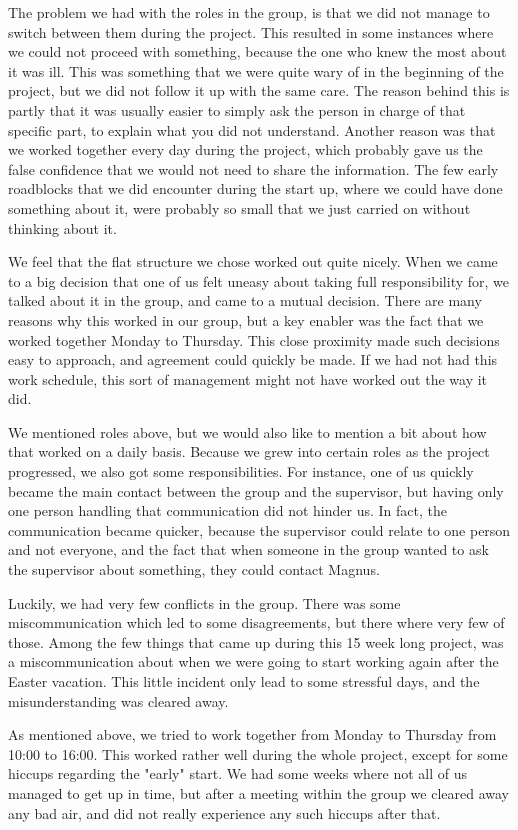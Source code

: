 The problem we had with the roles in the group, is that we did not manage to switch between them during the project. This resulted in some instances where we could not proceed with something, because the one who knew the most about it was ill. This was something that we were quite wary of in the beginning of the project, but we did not follow it up with the same care. The reason behind this is partly that it was usually easier to simply ask the person in charge of that specific part, to explain what you did not understand. Another reason was that we worked together every day during the project, which probably gave us the false confidence that we would not need to share the information. The few early roadblocks that we did encounter during the start up, where we could have done something about it, were probably so small that we just carried on without thinking about it.

We feel that the flat structure we chose worked out quite nicely. When we came to a big decision that one of us felt uneasy about taking full responsibility for, we talked about it in the group, and came to a mutual decision. There are many reasons why this worked in our group, but a key enabler was the fact that we worked together Monday to Thursday. This close proximity made such decisions easy to approach, and agreement could quickly be made. If we had not had this work schedule, this sort of management might not have worked out the way it did.

We mentioned roles above, but we would also like to mention a bit about how that worked on a daily basis. Because we grew into certain roles as the project progressed, we also got some responsibilities. For instance, one of us quickly became the main contact between the group and the supervisor, but having only one person handling that communication did not hinder us. In fact, the communication became quicker, because the supervisor could relate to one person and not everyone, and the fact that when someone in the group wanted to ask the supervisor about something, they could contact Magnus.

Luckily, we had very few conflicts in the group. There was some miscommunication which led to some disagreements, but there where very few of those. Among the few things that came up during this 15 week long project, was a miscommunication about when we were going to start working again after the Easter vacation. This little incident only lead to some stressful days, and the misunderstanding was cleared away.

As mentioned above, we tried to work together from Monday to Thursday from 10:00 to 16:00. This worked rather well during the whole project, except for some hiccups regarding the "early" start. We had some weeks where not all of us managed to get up in time, but after a meeting within the group we cleared away any bad air, and did not really experience any such hiccups after that.
